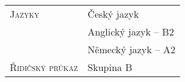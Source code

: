 \documentclass[a4paper, oneside, final]{scrartcl} %
\newcommand{\splitspace}{3.39cm}
\begin{document}
\begin{center}
	\vspace{15pt}

	\begin{tabularx}{0.97\linewidth}{>{\raggedleft\scshape}p{\splitspace}X}
		Jazyky          & Český jazyk          \\
		                & Anglický jazyk -- B2 \\
		                & Německý jazyk -- A2  \\
		Řidičský průkaz & Skupina B            \\
	\end{tabularx}

\end{center}
\end{document}
